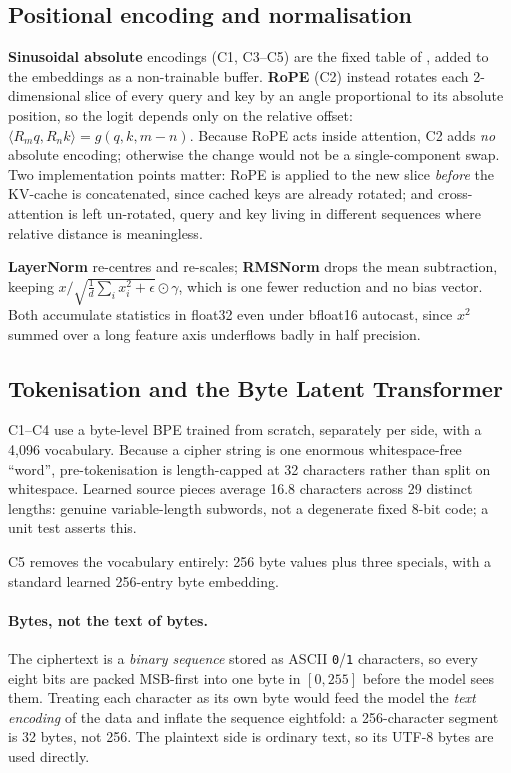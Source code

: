 \documentclass[12pt,a4paper]{article}
\begin{document}
\subsection{Positional encoding and normalisation}
\textbf{Sinusoidal absolute} encodings (C1, C3--C5) are the fixed table of
\citet{vaswani2017attention}, added to the embeddings as a non-trainable buffer.
\textbf{RoPE} (C2) instead rotates each 2-dimensional slice of every query and key
by an angle proportional to its absolute position, so the logit depends only on
the relative offset: $\langle R_m q, R_n k\rangle = g(q,k,m-n)$. Because RoPE acts
inside attention, C2 adds \emph{no} absolute encoding; otherwise the change would
not be a single-component swap. Two implementation points matter: RoPE is applied
to the new slice \emph{before} the KV-cache is concatenated, since cached keys are
already rotated; and cross-attention is left un-rotated, query and key living in
different sequences where relative distance is meaningless.

\textbf{LayerNorm} \citep{ba2016layernorm} re-centres and re-scales;
\textbf{RMSNorm} \citep{zhang2019rmsnorm} drops the mean subtraction, keeping
$x / \sqrt{\tfrac{1}{d}\sum_i x_i^2 + \epsilon} \odot \gamma$, which is one
fewer reduction and no bias vector. Both accumulate statistics in float32 even under
bfloat16 autocast, since $x^2$ summed over a long feature axis underflows badly in
half precision.

\subsection{Tokenisation and the Byte Latent Transformer}
\label{sec:blt-arch}
C1--C4 use a byte-level BPE \citep{sennrich2016bpe} trained from scratch,
separately per side, with a 4{,}096 vocabulary. Because a cipher string is one
enormous whitespace-free ``word'', pre-tokenisation is length-capped at 32
characters rather than split on whitespace. Learned source pieces average 16.8
characters across 29 distinct lengths: genuine variable-length subwords, not a
degenerate fixed 8-bit code; a unit test asserts this.

C5 removes the vocabulary entirely: 256 byte values plus three specials, with a
standard learned 256-entry byte embedding.

\paragraph{Bytes, not the text of bytes.} The ciphertext is a \emph{binary
sequence} stored as ASCII \texttt{0}/\texttt{1} characters, so every eight bits
are packed MSB-first into one byte in $[0,255]$ before the model sees them.
Treating each character as its own byte would feed the model the \emph{text
encoding} of the data and inflate the sequence eightfold: a 256-character segment
is 32 bytes, not 256. The plaintext side is ordinary text, so its UTF-8 bytes are
used directly.
\end{document}
